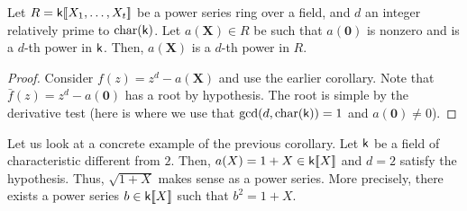 \begin{cor}
	Let $R = \mathsf{k}[\![X_{1}, \ldots, X_{t}]\!]$ be a power series ring over a field, and $d$ an integer relatively prime to $\operatorname{char}(\mathsf{k})$. Let $a(\mathbf{X}) \in R$ be such that $a(\mathbf{0})$ is nonzero and is a $d$-th power in $\mathsf{k}$. Then, $a(\mathbf{X})$ is a $d$-th power in $R$.
\end{cor}
\begin{proof} 
	Consider $f(z) = z^{d} - a(\mathbf{X})$ and use the earlier corollary. Note that $\bar{f}(z) = z^{d} - a(\mathbf{0})$ has a root by hypothesis. The root is simple by the derivative test (here is where we use that $\gcd(d, \operatorname{char}(\mathsf{k})) = 1$ and $a(\mathbf{0}) \neq 0$).
\end{proof}

\begin{ex}
	Let us look at a concrete example of the previous corollary. Let $\mathsf{k}$ be a field of characteristic different from $2$. Then, $a(X) = 1 + X \in \mathsf{k}[\![X]\!]$ and $d = 2$ satisfy the hypothesis. Thus, $\sqrt{1 + X}$ makes sense as a power series. More precisely, there exists a power series $b \in \mathsf{k} [\![X]\!]$ such that $b^{2} = 1 + X$.
\end{ex}